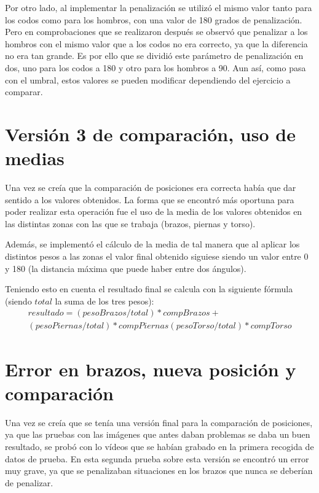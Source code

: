 {Por otro lado, al implementar la penalización se utilizó el mismo valor tanto para los codos como para los hombros, con una valor de 180 grados de penalización. Pero en comprobaciones que se realizaron después se observó que penalizar a los hombros con el mismo valor que a los codos no era correcto, ya que la diferencia no era tan grande. Es por ello que se dividió este parámetro de penalización en dos, uno para los codos a 180 y otro para los hombros a 90. Aun así, como pasa con el umbral, estos valores se pueden modificar dependiendo del ejercicio a comparar.

\section{Versión 3 de comparación, uso de medias}
Una vez se creía que la comparación de posiciones era correcta había que dar sentido a los valores obtenidos. La forma que se encontró más oportuna para poder realizar esta operación fue el uso de la media de los valores obtenidos en las distintas zonas con las que se trabaja (brazos, piernas y torso).

Además, se implementó el cálculo de la media de tal manera que al aplicar los distintos pesos a las zonas el valor final obtenido siguiese siendo un valor entre 0 y 180 (la distancia máxima que puede haber entre dos ángulos).

Teniendo esto en cuenta el resultado final se calcula con la siguiente fórmula (siendo $total$ la suma de los tres pesos):
\begin{equation}
\begin{split}
resultado = (pesoBrazos/total)*compBrazos +\\ (pesoPiernas/total)*compPiernas (pesoTorso/total)*compTorso
\end{split}
\end{equation}

\section{Error en brazos, nueva posición y comparación}
Una vez se creía que se tenía una versión final para la comparación de posiciones, ya que las pruebas con las imágenes que antes daban problemas se daba un buen resultado, se probó con lo vídeos que se habían grabado en la primera recogida de datos de prueba. En esta segunda prueba sobre esta versión se encontró un error muy grave, ya que se penalizaban situaciones en los brazos que nunca se deberían de penalizar.

}
